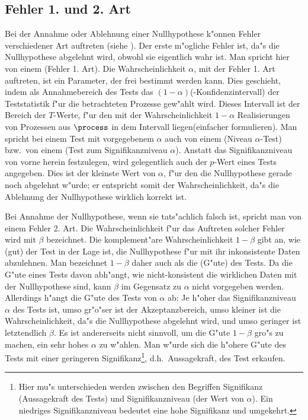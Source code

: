 \subsection{Fehler 1. und 2. Art}
Bei der Annahme oder Ablehnung einer Nullhypothese k"onnen Fehler verschiedener Art
auftreten (siehe ). Der
erste m"ogliche Fehler ist, da"s die Nullhypothese abgelehnt wird, obwohl sie eigentlich wahr ist.
Man spricht hier von einem \begriff(Fehler 1. Art). Die Wahrscheinlichkeit $\alpha$, mit
der Fehler 1. Art auftreten, ist ein Parameter, der frei bestimmt werden kann. Dies geschieht, indem als
Annahmebereich des Tests das $(1-\alpha)$\begriff(-Konfidenzintervall) der Teststatistik
f"ur die betrachteten Prozesse gew"ahlt wird. Dieses Intervall ist der
Bereich der $T$-Werte, f"ur den mit der Wahrscheinlichkeit $1-\alpha$ Realisierungen von
Prozessen aus $\process$ in dem Intervall liegen\korrektur(einfacher formulieren).  Man
spricht bei einem Test mit vorgegebenem $\alpha$ auch von einem \begriff(Niveau
$\alpha$-Test) bzw.\ von einem \begriff(Test zum Signifikanzniveau $\alpha$). Anstatt das
Signifikanzniveau von vorne herein festzulegen, wird gelegentlich auch der $p$-Wert eines Tests
angegeben. Dies ist der kleinste Wert von $\alpha$, f"ur den die Nullhypothese gerade noch
abgelehnt w"urde; er entspricht somit der Wahrscheinlichkeit, da"s die Ablehnung der
Nullhypothese wirklich korrekt ist.

Bei Annahme der Nullhypothese, wenn sie tats"achlich falsch ist, spricht man von einem
Fehler 2. Art.  Die Wahrscheinlichkeit f"ur das Auftreten solcher Fehler wird mit $\beta$
bezeichnet. Die komplement"are Wahrscheinlichkeit $1-\beta$ gibt an, wie \naja(gut) der
Test in der Lage ist, die Nullhypothese f"ur mit ihr inkonsistente Daten abzulehnen. Man
bezeichnet $1-\beta$ daher auch als die \begriff(G"ute) des Tests.  Da die G"ute eines
Tests davon abh"angt, wie nicht-konsistent die wirklichen Daten mit der Nullhypothese
sind, kann $\beta$ im Gegensatz zu $\alpha$ nicht vorgegeben werden.  Allerdings h"angt
die G"ute des Tests von $\alpha$ ab: Je h"oher das Signifikanzniveau $\alpha$ des Tests
ist, umso gr"o"ser ist der Akzeptanzbereich, umso kleiner ist die Wahrscheinlichkeit, da"s
die Nullhypothese abgelehnt wird, und umso geringer ist letztendlich $\beta$.  Es ist
andererseits nicht sinnvoll, um die G"ute $1-\beta$ gro"s zu machen, ein sehr hohes
$\alpha$ zu w"ahlen. Man w"urde sich die h"ohere G"ute des Tests mit einer geringeren
Signifikanz\footnote{Hier mu"s unterschieden werden zwischen den Begriffen Signifikanz
  (Aussagekraft des Tests) und Signifikanzniveau (der Wert von $\alpha$). Ein niedriges
  Signifikanzniveau bedeutet eine hohe Signifikanz und umgekehrt.}, d.h.\ Aussagekraft,
des Test erkaufen.

